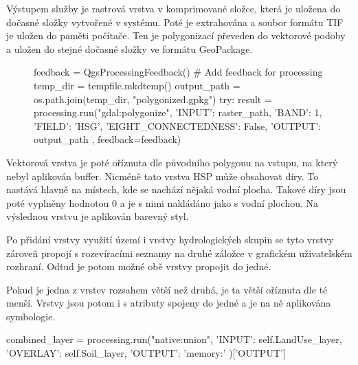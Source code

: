 \documentclass[a4paper,oneside,12pt]{book}
\begin{document}
\hspace{10mm}Výstupem služby je rastrová vrstva v komprimované složce, která je uložena do dočasné složky vytvořené v systému. Poté je extrahována a soubor formátu TIF je uložen do paměti počítače. Ten je polygonizací převeden do vektorové podoby a uložen do stejné dočasné složky ve formátu GeoPackage.

\begin{figure}[H]
\begin{pythoncode}[style=mypython, caption={Polygonizace rastrové vrstvy},label={kod:polygonizace}]
feedback = QgsProcessingFeedback()  # Add feedback for processing
        temp_dir = tempfile.mkdtemp()
        output_path = os.path.join(temp_dir, "polygonized.gpkg")
        try:
            result = processing.run("gdal:polygonize", {
                'INPUT': raster_path,
                'BAND': 1,
                'FIELD': 'HSG',
                'EIGHT_CONNECTEDNESS': False,
                'OUTPUT': output_path
            }, feedback=feedback)
\end{pythoncode}
\end{figure}

\hspace{10mm}Vektorová vrstva je poté oříznuta dle původního polygonu na vstupu, na který nebyl aplikován buffer. Nicméně tato vrstva HSP může obsahovat díry. To nastává hlavně na místech, kde se nachází nějaká vodní plocha. Takové díry jsou poté vyplněny hodnotou 0 a je s nimi nakládáno jako s vodní plochou. Na výslednou vrstvu je aplikován barevný styl.

\hspace{10mm}Po přidání vrstvy využití území i vrstvy hydrologických skupin se tyto vrstvy zároveň propojí s rozevíracími seznamy na druhé záložce v grafickém uživatelském rozhraní. Odtud je potom možné obě vrstvy propojit do jedné.

\hspace{10mm}Pokud je jedna z vrstev rozsahem větší než druhá, je ta větší oříznuta dle té menší. Vrstvy jsou potom i s atributy spojeny do jedné a je na ně aplikována symbologie.

\begin{pythoncode}[style=mypython, caption={Propojení vrstev využití území a HSP},label={kod:intersection}]
combined_layer = processing.run("native:union", {
                'INPUT': self.LandUse_layer,
                'OVERLAY': self.Soil_layer,
                'OUTPUT': 'memory:'
            })['OUTPUT']
\end{pythoncode}
\end{document}
